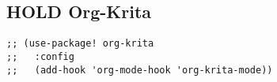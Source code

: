 \documentclass[8pt]{article}
\begin{document}
\subsection{{\bfseries\sffamily HOLD} Org-Krita}
\label{sec:orgf89b907}
\begin{verbatim}
;; (use-package! org-krita
;;   :config
;;   (add-hook 'org-mode-hook 'org-krita-mode))
\end{verbatim}
\end{document}
